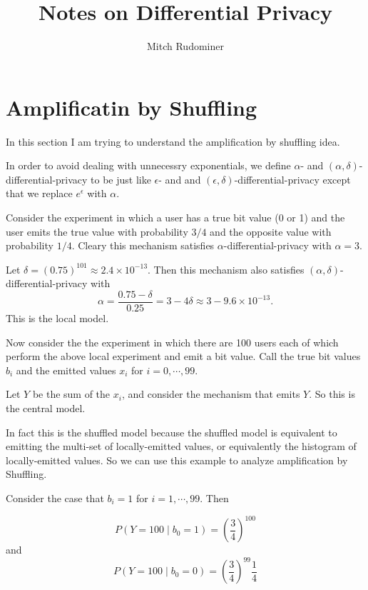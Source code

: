 \documentclass[oneside,12pt]{amsart}
\begin{document}
\title{Notes on Differential Privacy}
\author{Mitch Rudominer}

\maketitle

\tableofcontents


\section{Amplificatin by Shuffling}

In this section I am trying to understand the amplification by shuffling idea.

In order to avoid dealing with unnecessry exponentials, we define 
$\alpha$- and $(\alpha,\delta)$-differential-privacy to
be just like $\epsilon$- and  and $(\epsilon,\delta)$-differential-privacy except that
we replace $e^{\epsilon}$ with $\alpha$.

Consider the experiment in which a user has a true bit value (0 or 1) and the user
emits the true value with probability $3/4$ and the opposite value with
probability $1/4$. Cleary this mechanism satisfies $\alpha$-differential-privacy
with $\alpha=3$. 

Let $\delta=(0.75)^{101} \approx 2.4\times 10^{-13}$. Then this mechanism also satisfies
$(\alpha,\delta)$-differential-privacy with 
$$\alpha=\frac{0.75 - \delta}{0.25} = 3-4\delta \approx 3-9.6\times 10^{-13}.$$
This is the local model.

Now consider the the experiment in which there are 100 users each of which perform the
above local experiment and emit a bit value. Call the true bit values $b_i$ and the
emitted values $x_i$ for $i=0,\cdots,99$.

Let $Y$ be the sum of the $x_i$, and consider the mechanism that emits $Y$. So this
is the central model.

In fact this is the shuffled model because the shuffled model is equivalent to emitting
the multi-set of locally-emitted values, or equivalently the histogram of locally-emitted
values. So we can use this example to analyze amplification by Shuffling.


Consider the case that $b_i=1$ for $i=1,\cdots,99$. Then

$$P(Y=100 \mid b_0 = 1) = \left(\frac{3}{4}\right)^{100}$$
and
$$P(Y=100 \mid b_0 = 0) = \left(\frac{3}{4}\right)^{99}\frac{1}{4}$$
\end{document}
